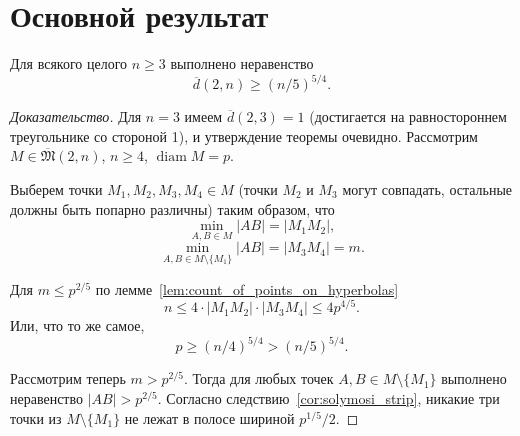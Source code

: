 \documentclass[11pt,twoside,draft
]{article}
\begin{document}
\section{Основной результат}

\begin{theorem}
	\label{thm:main_result}
	Для всякого целого $n \geq 3$ выполнено неравенство
	\begin{equation}
		\overline{d}(2,n) \geq (n/5)^{5/4}
		.
	\end{equation}
\end{theorem}

\begin{proof}[Доказательство]
	Для $n = 3$ имеем $\overline{d}(2,3) = 1$ (достигается на равностороннем треугольнике со стороной 1),
	и утверждение теоремы очевидно.
	Рассмотрим $M\in\overline{\mathfrak{M}}(2,n)$, $n \geq 4$, $\operatorname{diam} M = p$.

	Выберем точки $M_1, M_2, M_3, M_4 \in M$
	(точки $M_2$ и $M_3$ могут совпадать, остальные должны быть попарно различны) таким образом, что
	\begin{equation}
		\min_{A, B \in M} |AB| = |M_1 M_2|
		,
	\end{equation}
	\begin{equation}
		\min_{A, B \in M \setminus \{M_1\}} |AB| = |M_3 M_4| = m
		.
	\end{equation}

	Для $m \leq p^{2/5}$ по лемме~\ref{lem:count_of_points_on_hyperbolas}
	\begin{equation}
		n \leq 4 \cdot |M_1 M_2| \cdot |M_3 M_4| \leq  4 p^{4/5}
		.
	\end{equation}
	Или, что то же самое,
	\begin{equation}
		\label{eq:hyperbolas_5_4}
		p \geq (n/4) ^ {5/4} > (n/5) ^ {5/4}
		.
	\end{equation}

	Рассмотрим теперь $m > p^{2/5}$.
	Тогда для любых точек $A,B \in M\setminus\{M_1\}$ выполнено неравенство $|AB| > p^{2/5}$.
	Согласно следствию~\ref{cor:solymosi_strip}, никакие три точки из  $M\setminus\{M_1\}$
	не лежат в полосе шириной $p^{1/5} / 2$.




\end{proof}
\end{document}
